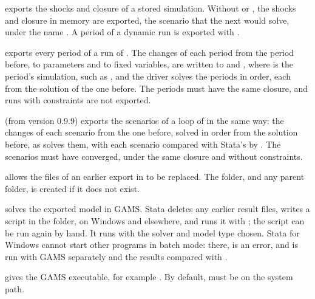 \begin{optdesc}
\item[\optarg{}{sim}{name}] exports the shocks and closure of a stored
simulation. Without  or , the shocks and closure in
memory are exported, the scenario that the next  would
solve, under the name . A period of a dynamic run is exported
with .

\item[\optarg{dyn}{amic}{name}] exports every period of a run of
. The changes of each period from the period before, to
parameters and to fixed variables, are written to
\mbox{} and \mbox{},
where  is the period's simulation, such as , and the
driver solves the periods in order, each from the solution of the one before.
The periods must have the same closure, and runs with constraints are not
exported.

\item[\optarg{}{loop}{name}] (from version 0.9.9) exports the scenarios of a
loop of  in the same way: the changes of each scenario from
the one before, solved in order from the solution before, as 
solves them, with each scenario compared with Stata's by . The
scenarios must have converged, under the same closure and without
constraints.

\item[\opt{}{replace}] allows the files of an earlier export in 
to be replaced. The folder, and any parent folder, is created if it does not
exist.

\item[\opt{}{run}] solves the exported model in GAMS. Stata deletes any
earlier result files, writes a script in the folder,  on
Windows and  elsewhere, and runs it with ; the
script can be run again by hand. It runs
 with the solver and model type
chosen. Stata for Windows cannot start other programs in batch mode: there,
 is an error, and  is run with GAMS separately and
the results compared with  .

\item[\optarg{}{gams}{path}] gives the GAMS executable, for example
. By default,  must be on the system
path.


\end{optdesc}
